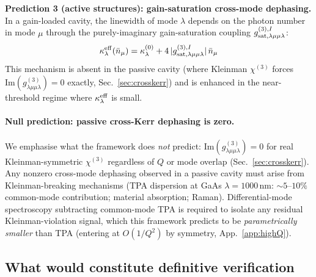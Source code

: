 \documentclass[12pt]{article}
\begin{document}
\textbf{Prediction 3 (active structures): gain-saturation cross-mode
dephasing.}
In a gain-loaded cavity, the linewidth of mode $\lambda$ depends on
the photon number in mode $\mu$ through the purely-imaginary
gain-saturation coupling $g^{(3),I}_{\rm sat,\lambda\mu\mu\lambda}$:
\begin{equation}
  \kappa_\lambda^{\rm eff}(\bar{n}_\mu) = \kappa_\lambda^{(0)}
  +4\,|g^{(3),I}_{\rm sat,\lambda\mu\mu\lambda}|\,\bar{n}_\mu
  \label{eq:prediction3}
\end{equation}
This mechanism is absent in the passive cavity (where Kleinman
$\chi^{(3)}$ forces $\mathrm{Im}(g^{(3)}_{\lambda\mu\mu\lambda})=0$
exactly, Sec.~\ref{sec:crosskerr}) and is enhanced in the
near-threshold regime where $\kappa_\lambda^{\rm eff}$ is small.

\paragraph{Null prediction: passive cross-Kerr dephasing is zero.}
We emphasise what the framework does \emph{not} predict:
$\mathrm{Im}(g^{(3)}_{\lambda\mu\mu\lambda})=0$ for real
Kleinman-symmetric $\chi^{(3)}$ regardless of $Q$ or mode overlap
(Sec.~\ref{sec:crosskerr}).  Any nonzero cross-mode dephasing observed
in a passive cavity must arise from Kleinman-breaking mechanisms
(TPA dispersion at GaAs $\lambda=1000\,\mathrm{nm}$: $\sim 5$--$10\%$
common-mode contribution; material absorption;
Raman). Differential-mode spectroscopy subtracting common-mode TPA is
required to isolate any residual Kleinman-violation signal, which
this framework predicts to be \emph{parametrically smaller} than
TPA (entering at $O(1/Q^2)$ by symmetry, App.~\ref{app:highQ}).

\subsection{What would constitute definitive verification}
\end{document}

